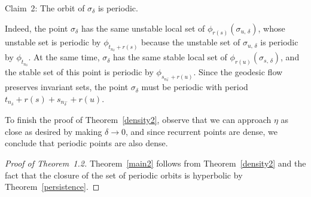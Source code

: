 \documentclass[AHL,Unicode,longabstracts,published]{cedram}
\begin{document}
\begin{enonce*}[plain]{Claim~2}: The orbit of $\sigma_{\delta}$ is periodic.
\end{enonce*}

Indeed, the point $\sigma_{\delta}$ has the same unstable local set of $\phi_{r(s)}(\sigma_{u,\,\delta})$, whose unstable set is periodic by $\phi_{t_{n_{\delta}}+ r(s)}$ because the unstable set of $\sigma_{u,\,\delta}$ is periodic by $\phi_{t_{n_{\delta}}}$. At the same time, $\sigma_{\delta}$ has the same stable local set of $\phi_{r(u)}(\sigma_{s,\,\delta})$, and the stable set of this point is periodic by $\phi_{s_{n_{\delta}^{-}}+ r(u)}$. Since the geodesic flow preserves invariant sets, the point $\sigma_{\delta}$ must be periodic with period $t_{n_{\delta}}+ r(s) + s_{n_{\delta}^{-}} + r(u)$.

To finish the proof of Theorem~\ref{density2}, observe that we can approach $\eta$ as close as desired by making $\delta \rightarrow 0$, and since recurrent points are dense, we conclude that periodic points are also dense.

\begin{proof}[{Proof of Theorem~1.2}]
Theorem~\ref{main2} follows from Theorem~\ref{density2} and the fact that the closure of the set of periodic orbits is hyperbolic by Theorem~\ref{persistence}.
\end{proof}


\end{document}
